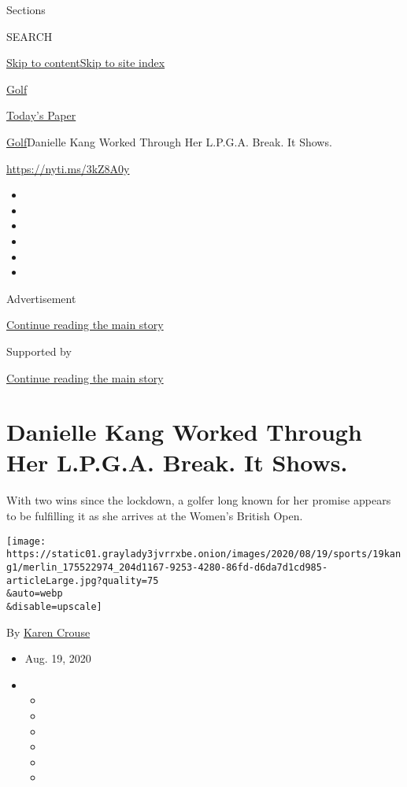 Sections

SEARCH

\protect\hyperlink{site-content}{Skip to
content}\protect\hyperlink{site-index}{Skip to site index}

\href{https://www.nytimes3xbfgragh.onion/section/sports/golf}{Golf}

\href{https://myaccount.nytimes3xbfgragh.onion/auth/login?response_type=cookie\&client_id=vi}{}

\href{https://www.nytimes3xbfgragh.onion/section/todayspaper}{Today's
Paper}

\href{/section/sports/golf}{Golf}\textbar{}Danielle Kang Worked Through
Her L.P.G.A. Break. It Shows.

\url{https://nyti.ms/3kZ8A0y}

\begin{itemize}
\item
\item
\item
\item
\item
\item
\end{itemize}

Advertisement

\protect\hyperlink{after-top}{Continue reading the main story}

Supported by

\protect\hyperlink{after-sponsor}{Continue reading the main story}

\hypertarget{danielle-kang-worked-through-her-lpga-break-it-shows}{%
\section{Danielle Kang Worked Through Her L.P.G.A. Break. It
Shows.}\label{danielle-kang-worked-through-her-lpga-break-it-shows}}

With two wins since the lockdown, a golfer long known for her promise
appears to be fulfilling it as she arrives at the Women's British Open.

\texttt{[image: https://static01.graylady3jvrrxbe.onion/images/2020/08/19/sports/19kang1/merlin\_175522974\_204d1167-9253-4280-86fd-d6da7d1cd985-articleLarge.jpg?quality=75\\\&auto=webp\\\&disable=upscale]}

By \href{https://www.nytimes3xbfgragh.onion/by/karen-crouse}{Karen
Crouse}

\begin{itemize}
\item
  Aug. 19, 2020
\item
  \begin{itemize}
  \item
  \item
  \item
  \item
  \item
  \item
  \end{itemize}
\end{itemize}

